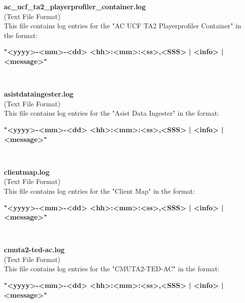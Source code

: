 \begin{description}
\begin{addmargin}[0em]{0em}
    \label{ac_ucf_ta2_playerprofiler_container.log}
    \begin{addmargin}[1em]{0em} %
        \textbf{ac\_ucf\_ta2\_playerprofiler\_container.log}\\
        (Text File Format)\\
        This file contains log entries for the "AC UCF TA2 Playerprofiler Container" in the format:
        \begin{addmargin}[1em]{0em}
            \textbf{"<yyyy>-<mm>-<dd> <hh>:<mm>:<ss>,<SSS> | <info> | <message>"}
        \end{addmargin}
    \end{addmargin} %
    \textbf{\\}

    \label{asistdataingester.log}
    \begin{addmargin}[1em]{0em} %
        \textbf{asistdataingester.log}\\
        (Text File Format)\\
        This file contains log entries for the "Asist Data Ingester" in the format:
        \begin{addmargin}[1em]{0em}
            \textbf{"<yyyy>-<mm>-<dd> <hh>:<mm>:<ss>,<SSS> | <info> | <message>"}
        \end{addmargin}
    \end{addmargin} %
    \textbf{\\}

    \label{clientmap.log}
    \begin{addmargin}[1em]{0em} %
        \textbf{clientmap.log}\\
        (Text File Format)\\
        This file contains log entries for the "Client Map" in the format:
        \begin{addmargin}[1em]{0em}
            \textbf{"<yyyy>-<mm>-<dd> <hh>:<mm>:<ss>,<SSS> | <info> | <message>"}
        \end{addmargin}
    \end{addmargin} %
    \textbf{\\}

    \label{cmuta2-ted-ac.log}
    \begin{addmargin}[1em]{0em} %
        \textbf{cmuta2-ted-ac.log}\\
        (Text File Format)\\
        This file contains log entries for the "CMUTA2-TED-AC" in the format:
        \begin{addmargin}[1em]{0em}
            \textbf{"<yyyy>-<mm>-<dd> <hh>:<mm>:<ss>,<SSS> | <info> | <message>"}
        \end{addmargin}
    \end{addmargin} %
    \textbf{\\}


\end{addmargin}
\end{description}
